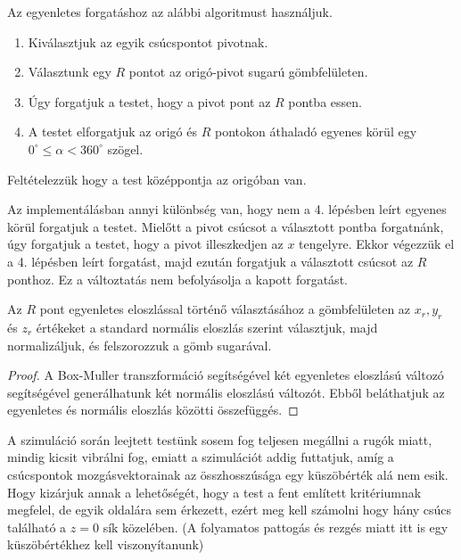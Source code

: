 \noindent Az egyenletes forgatáshoz az alábbi algoritmust használjuk.
\begin{enumerate}
	\item Kiválasztjuk az egyik csúcspontot pivotnak.
	\item Választunk egy $R$ pontot az origó-pivot sugarú gömbfelületen.
	\item Úgy forgatjuk a testet, hogy a pivot pont az $R$ pontba essen.
	\item A testet elforgatjuk az origó és $R$  pontokon áthaladó egyenes körül egy $0^\circ \leq \alpha < 360^\circ$ szögel.
\end{enumerate}
\begin{remark}
Feltételezzük hogy a test középpontja az origóban van.
\end{remark}
Az implementálásban annyi különbség van, hogy nem a 4. lépésben leírt egyenes körül forgatjuk a testet.
Mielőtt a pivot csúcsot a választott pontba forgatnánk, úgy forgatjuk a testet, hogy a pivot illeszkedjen az $x$ tengelyre.
Ekkor végezzük el a 4. lépésben leírt forgatást, majd ezután forgatjuk a választott csúcsot az $R$ ponthoz.
Ez a változtatás nem befolyásolja a kapott forgatást.

Az $R$ pont egyenletes eloszlással történő választásához a gömbfelületen az $x_r, y_r$ és $z_r$ értékeket a standard normális eloszlás szerint választjuk, majd normalizáljuk, és felszorozzuk a gömb sugarával.
\begin{proof}
A Box-Muller transzformáció \cite{boxmuller} segítségével két egyenletes eloszlású változó segítségével generálhatunk két normális eloszlású változót. Ebből beláthatjuk az egyenletes és normális eloszlás közötti összefüggés.
\end{proof}


A szimuláció során leejtett testünk sosem fog teljesen megállni a rugók miatt, mindig kicsit vibrálni fog, emiatt a szimulációt addig futtatjuk, amíg a csúcspontok mozgásvektorainak az összhosszúsága egy küszöbérték alá nem esik.
Hogy kizárjuk annak a lehetőségét, hogy a test a fent említett kritériumnak megfelel, de egyik oldalára sem érkezett, ezért meg kell számolni hogy hány csúcs található a $z=0$ sík közelében. (A folyamatos pattogás és rezgés miatt itt is egy küszöbértékhez kell viszonyítanunk)

